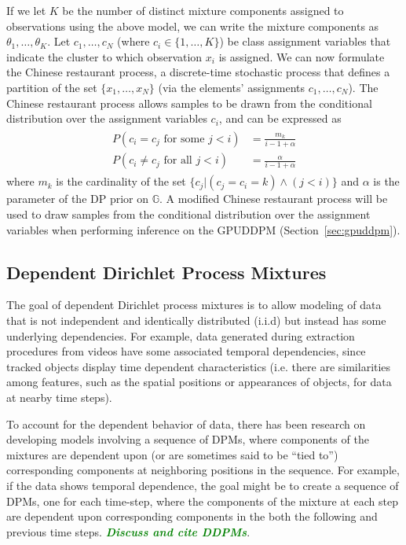 \documentclass[smallcondensed, final]{svjour3}
\newcommand{\willie}[1]{\textcolor{green}{\textsf{\emph{\textbf{\textcolor{green}{#1}}}}}}
\begin{document}
If we let $K$ be the number of distinct mixture components assigned to observations using the above model, we can write the mixture components as $\theta_{1}, \ldots, \theta_{K}$. Let $c_{1}, \ldots, c_{N}$ (where $c_{i} \in \{1, \ldots, K \}$) be class assignment variables that indicate the cluster to which observation $x_{i}$ is assigned. We can now formulate the Chinese restaurant process, a discrete-time stochastic process that defines a partition of the set $\{ x_{1}, \ldots, x_{N} \}$ (via the elements' assignments $c_{1}, \ldots, c_{N}$). The Chinese restaurant process allows samples to be drawn from the conditional distribution over the assignment variables $c_{i}$, and can be expressed as
\begin{align}
\begin{split}
\label{crp_rep}
	P(c_{i} = c_{j} \text{  for some  } j<i) &= \frac{m_{k}}{i-1+\alpha}\\
	P(c_{i} \neq c_{j} \text{  for all  } j<i) &= \frac{\alpha}{i-1+\alpha}
\end{split}
\end{align}
where $m_{k}$ is the cardinality of the set $\{ c_{j} | (c_{j}=c_{i}=k)  \wedge  (j < i) \}$ and $\alpha$ is the parameter of the DP prior on $\mathbb{G}$. A modified Chinese restaurant process will be used to draw samples from the conditional distribution over the assignment variables when performing inference on the GPUDDPM (Section~\ref{sec:gpuddpm}).






\subsection{Dependent Dirichlet Process Mixtures}
\label{sec:ddpm}

The goal of dependent Dirichlet process mixtures is to allow modeling of data that is not independent and identically distributed (i.i.d) but instead has some underlying dependencies. For example, data generated during extraction procedures from videos have some associated temporal dependencies, since tracked objects display time dependent characteristics (i.e. there are similarities among features, such as the spatial positions or appearances of objects, for data at nearby time steps).

To account for the dependent behavior of data, there has been research on developing models involving a sequence of DPMs, where components of the mixtures are dependent upon (or are sometimes said to be ``tied to'') corresponding components at neighboring positions in the sequence. For example, if the data shows temporal dependence, the goal might be to create a sequence of DPMs, one for each time-step, where the components of the mixture at each step are dependent upon corresponding components in the both the following and previous time steps. \willie{Discuss and cite DDPMs}.
\end{document}
